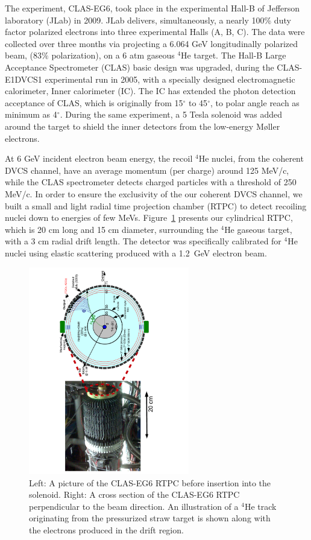 \documentclass[nofootinbib,twocolumn,showpacs,prl,superscriptaddress,secnumarabic,amssymb,nobibnotes,aps,floatfix]{revtex4}
\begin{document}

The experiment, CLAS-EG6, took place in the experimental Hall-B of Jefferson 
laboratory (JLab) in 2009. JLab delivers, simultaneously, a nearly 100\% duty 
factor polarized electrons into three experimental Halls (A, B, C). The data 
were collected over three months via projecting a 6.064 GeV longitudinally 
polarized beam, (83$\%$ polarization), on a 6 atm gaseous $^4$He target.  The 
Hall-B Large Acceptance Spectrometer (CLAS) basic design \cite{CLAS_ref} was 
upgraded, during the CLAS-E1DVCS1 experimental run \cite{Girod:2007aa} in 2005, 
with a specially designed electromagnetic calorimeter, Inner calorimeter (IC).  
The IC has extended the photon detection acceptance of CLAS, which is 
originally from 15$^{\circ}$ to 45$^{\circ}$, to polar angle reach as minimum 
as 4$^{\circ}$. During the same experiment, a 5 Tesla solenoid was added around 
the target to shield the inner detectors from the low-energy M\o ller 
electrons.

At 6 GeV incident electron beam energy, the recoil $^4$He nuclei, from the 
coherent DVCS channel, have an average momentum (per charge) around 125 MeV/c, 
while the CLAS spectrometer detects charged particles with a threshold of 250 
MeV/c. In order to ensure the exclusivity of the our coherent DVCS channel, we 
built a small and light radial time projection chamber (RTPC) to detect 
recoiling nuclei down to energies of few MeVs. Figure~\ref{fig:RTPC} presents 
our cylindrical RTPC, which is 20 cm long and 15 cm diameter, surrounding the 
$^4$He gaseous target, with a 3 cm radial drift length. The detector was 
specifically calibrated for $^4$He nuclei using elastic scattering produced 
with a 1.2~GeV electron beam.



\begin{figure}[tb]
\includegraphics[width=7.0cm,angle=-90]{figs/RTPC.pdf}
\vspace{-0.9cm}
\caption{Left: A picture of the CLAS-EG6 RTPC before insertion into the 
   solenoid.  Right: A cross section of the CLAS-EG6 RTPC perpendicular to the 
beam direction. An illustration of a $^4$He track originating from the 
pressurized straw target is shown along with the electrons produced in the 
drift region.}
\label{fig:RTPC}
\end{figure}
\end{document}
